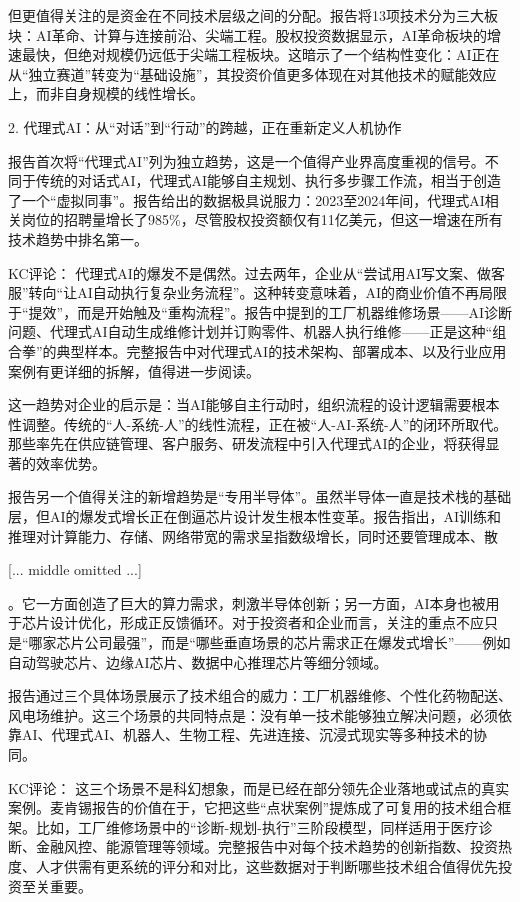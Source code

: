 \documentclass[11pt]{ctexart}
\begin{document}
但更值得关注的是资金在不同技术层级之间的分配。报告将13项技术分为三大板块：AI革命、计算与连接前沿、尖端工程。股权投资数据显示，AI革命板块的增速最快，但绝对规模仍远低于尖端工程板块。这暗示了一个结构性变化：AI正在从“独立赛道”转变为“基础设施”，其投资价值更多体现在对其他技术的赋能效应上，而非自身规模的线性增长。

2. 代理式AI：从“对话”到“行动”的跨越，正在重新定义人机协作

报告首次将“代理式AI”列为独立趋势，这是一个值得产业界高度重视的信号。不同于传统的对话式AI，代理式AI能够自主规划、执行多步骤工作流，相当于创造了一个“虚拟同事”。报告给出的数据极具说服力：2023至2024年间，代理式AI相关岗位的招聘量增长了985\%，尽管股权投资额仅有11亿美元，但这一增速在所有技术趋势中排名第一。

KC评论： 代理式AI的爆发不是偶然。过去两年，企业从“尝试用AI写文案、做客服”转向“让AI自动执行复杂业务流程”。这种转变意味着，AI的商业价值不再局限于“提效”，而是开始触及“重构流程”。报告中提到的工厂机器维修场景——AI诊断问题、代理式AI自动生成维修计划并订购零件、机器人执行维修——正是这种“组合拳”的典型样本。完整报告中对代理式AI的技术架构、部署成本、以及行业应用案例有更详细的拆解，值得进一步阅读。

这一趋势对企业的启示是：当AI能够自主行动时，组织流程的设计逻辑需要根本性调整。传统的“人-系统-人”的线性流程，正在被“人-AI-系统-人”的闭环所取代。那些率先在供应链管理、客户服务、研发流程中引入代理式AI的企业，将获得显著的效率优势。

报告另一个值得关注的新增趋势是“专用半导体”。虽然半导体一直是技术栈的基础层，但AI的爆发式增长正在倒逼芯片设计发生根本性变革。报告指出，AI训练和推理对计算能力、存储、网络带宽的需求呈指数级增长，同时还要管理成本、散

[... middle omitted ...]

。它一方面创造了巨大的算力需求，刺激半导体创新；另一方面，AI本身也被用于芯片设计优化，形成正反馈循环。对于投资者和企业而言，关注的重点不应只是“哪家芯片公司最强”，而是“哪些垂直场景的芯片需求正在爆发式增长”——例如自动驾驶芯片、边缘AI芯片、数据中心推理芯片等细分领域。

报告通过三个具体场景展示了技术组合的威力：工厂机器维修、个性化药物配送、风电场维护。这三个场景的共同特点是：没有单一技术能够独立解决问题，必须依靠AI、代理式AI、机器人、生物工程、先进连接、沉浸式现实等多种技术的协同。

KC评论： 这三个场景不是科幻想象，而是已经在部分领先企业落地或试点的真实案例。麦肯锡报告的价值在于，它把这些“点状案例”提炼成了可复用的技术组合框架。比如，工厂维修场景中的“诊断-规划-执行”三阶段模型，同样适用于医疗诊断、金融风控、能源管理等领域。完整报告中对每个技术趋势的创新指数、投资热度、人才供需有更系统的评分和对比，这些数据对于判断哪些技术组合值得优先投资至关重要。
\end{document}
